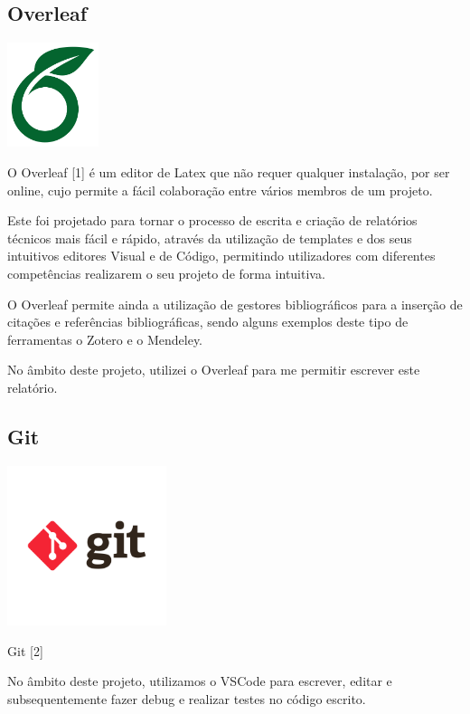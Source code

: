 \documentclass[a4paper,12pt]{article}
\begin{document}
\subsection{Overleaf}
    \includegraphics[width=0.2\textwidth]{overleaf.jpg} %
    \vspace{0.5cm}

O Overleaf [1] é um editor de Latex que não requer qualquer instalação, por ser online, cujo permite a fácil colaboração entre vários membros de um projeto.

Este foi projetado para tornar o processo de escrita e criação de relatórios técnicos mais fácil e rápido, através da utilização de templates e dos seus intuitivos editores Visual e de Código, permitindo utilizadores com diferentes competências realizarem o seu projeto de forma intuitiva.

O Overleaf permite ainda a utilização de gestores bibliográficos para a inserção de citações e referências bibliográficas, sendo alguns exemplos deste tipo de ferramentas o Zotero e o Mendeley.

No âmbito deste projeto, utilizei o Overleaf para me permitir escrever este relatório.

\subsection{Git}
    \includegraphics[width=0.35\textwidth]{git.png} %
    \vspace{0.5cm}

Git [2]

No âmbito deste projeto, utilizamos o VSCode para escrever, editar e subsequentemente fazer debug e realizar testes no código escrito.
\end{document}
